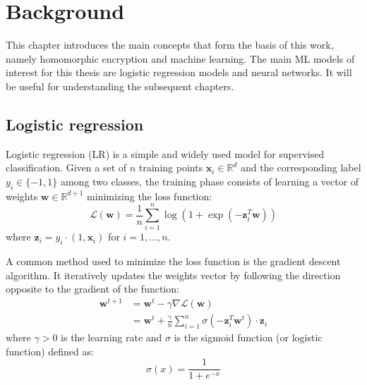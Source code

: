 \documentclass[a4paper,11pt,oneside]{report}
\begin{document}
\chapter{Background}\label{chap:background}



This chapter introduces the main concepts that form the basis of this work, namely homomorphic encryption and machine learning.
The main ML models of interest for this thesis are logistic regression models and neural networks.
It will be useful for understanding the subsequent chapters.

\section{Logistic regression}

Logistic regression (LR) is a simple and widely used model for supervised classification. 
Given a set of $n$ training points $\mathbf{x}_i \in \mathbb{R}^d$ and the corresponding label $y_i \in \{-1,1\}$ among two classes, the training phase consists of learning a vector of weights $\mathbf{w} \in \mathbb{R}^{d+1}$ minimizing the loss function:
\begin{equation}\label{eq:logistic_reg_train}
    \mathcal{L}(\mathbf{w}) = \frac{1}{n} \sum_{i=1}^{n} \log(1 + \exp(-\mathbf{z}_i^T \mathbf{w})) 
\end{equation}
where $\mathbf{z}_i = y_i \cdot (1, \mathbf{x}_i)$ for $i=1,...,n$.

A common method used to minimize the loss function is the gradient descent algorithm. 
It iteratively updates the weights vector by following the direction opposite to the gradient of the function:
\begin{align}\label{eq:gradient_descent}
    \mathbf{w}^{t+1} & = \mathbf{w}^t - \gamma\nabla\mathcal{L}(\mathbf{w}) \nonumber \\ 
    & = \mathbf{w}^t + \frac{\gamma}{n} \sum_{i=1}^{n} \sigma(-\mathbf{z}_i^T \mathbf{w}^t) \cdot \mathbf{z}_i
\end{align}
where $\gamma > 0$ is the learning rate and $\sigma$ is the sigmoid function (or logistic function) defined as:
\begin{equation}\label{eq:sigmoid}
    \sigma(x) = \frac{1}{1 + e^{-x}}
\end{equation}
\end{document}
